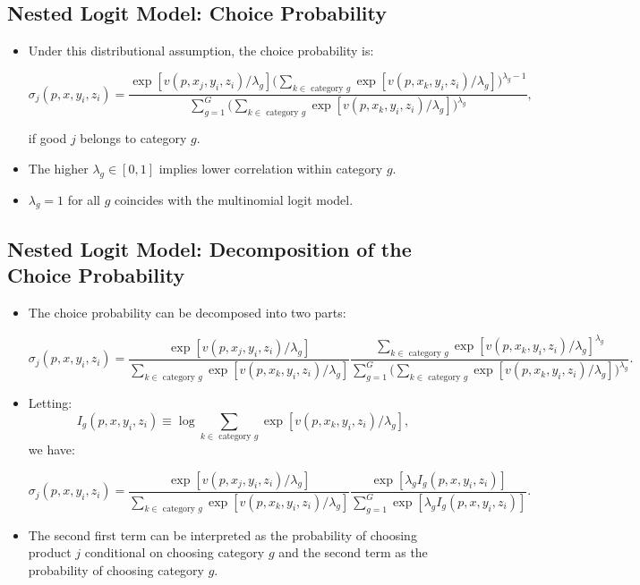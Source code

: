 \documentclass[]{book}
\providecommand{\tightlist}{%
  \setlength{\itemsep}{0pt}\setlength{\parskip}{0pt}}
\begin{document}
\subsection{Nested Logit Model: Choice
Probability}\label{nested-logit-model-choice-probability}

\begin{itemize}
\tightlist
\item
  Under this distributional assumption, the choice probability is:

  \begin{equation}
  \sigma_{j}(p, x, y_i, z_i) = \frac{\exp[v(p, x_j, y_i, z_i)/\lambda_g] \Bigg(\sum_{k \in \text{   category   } g} \exp[v(p, x_k, y_i, z_i)/\lambda_g]\Bigg)^{\lambda_g - 1}}{\sum_{g = 1}^G \Bigg(\sum_{k \in \text{   category   } g} \exp[v(p, x_k, y_i, z_i)/\lambda_g]\Bigg)^{\lambda_g}},
  \end{equation}

  if good \(j\) belongs to category \(g\).
\item
  The higher \(\lambda_g \in [0, 1]\) implies lower correlation within
  category \(g\).
\item
  \(\lambda_g = 1\) for all \(g\) coincides with the multinomial logit
  model.
\end{itemize}

\subsection{Nested Logit Model: Decomposition of the Choice
Probability}\label{nested-logit-model-decomposition-of-the-choice-probability}

\begin{itemize}
\tightlist
\item
  The choice probability can be decomposed into two parts:

  \begin{equation}
  \sigma_{j}(p, x, y_i, z_i) = \frac{\exp[v(p, x_j, y_i, z_i)/\lambda_g]}{\sum_{k \in \text{   category   } g} \exp[v(p, x_k, y_i, z_i)/\lambda_g]} \frac{\sum_{k \in \text{   category   } g} \exp[v(p, x_k, y_i, z_i)/\lambda_g]^{\lambda_g}}{\sum_{g = 1}^G \Bigg(\sum_{k \in \text{   category   } g} \exp[v(p, x_k, y_i, z_i)/\lambda_g]\Bigg)^{\lambda_g}}.
  \end{equation}
\item
  Letting: \[
  I_{g}(p, x, y_i, z_i) \equiv \log \sum_{k \in \text{   category   } g} \exp[v(p, x_k, y_i, z_i)/\lambda_g],
  \] we have:

  \begin{equation}
  \sigma_{j}(p, x, y_i, z_i) = \frac{\exp[v(p, x_j, y_i, z_i)/\lambda_g]}{\sum_{k \in \text{   category   } g} \exp[v(p, x_k, y_i, z_i)/\lambda_g]} \frac{\exp[\lambda_g I_{g}(p, x, y_i, z_i)]}{\sum_{g = 1}^G \exp[\lambda_g I_{g}(p, x, y_i, z_i)]}.
  \end{equation}
\item
  The second first term can be interpreted as the probability of
  choosing product \(j\) conditional on choosing category \(g\) and the
  second term as the probability of choosing category \(g\).
\end{itemize}
\end{document}
